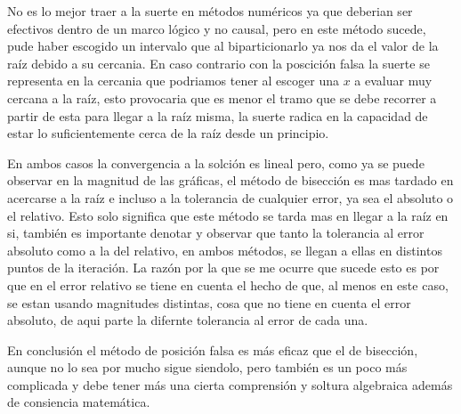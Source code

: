 \documentclass{article}
\begin{document}
No es lo mejor traer a la suerte en métodos numéricos ya que deberian ser efectivos dentro de un marco lógico y no causal, pero en este método sucede, pude haber escogido un intervalo que al biparticionarlo ya nos da el valor de la raíz debido a su cercania. En caso contrario con la poscición falsa la suerte se representa en la cercania que podriamos tener al escoger una $x$ a evaluar muy cercana a la raíz, esto provocaria que es menor el tramo que se debe recorrer a partir de esta para llegar a la raíz misma, la suerte radica en la capacidad de estar lo suficientemente cerca de la raíz desde un principio. 

En ambos casos la convergencia a la solción es lineal pero, como ya se puede observar en la magnitud de las gráficas, el método de bisección es mas tardado en acercarse a la raíz e incluso a la tolerancia de cualquier error, ya sea el absoluto o el relativo. Esto solo significa que este método se tarda mas en llegar a la raíz en si, también es importante denotar y observar que tanto la tolerancia al error absoluto como a la del relativo, en ambos métodos, se llegan a ellas en distintos puntos de la iteración. La razón por la que se me ocurre que sucede esto es por que en el error relativo se tiene en cuenta el hecho de que, al menos en este caso, se estan usando magnitudes distintas, cosa que no tiene en cuenta el error absoluto, de aqui parte la difernte tolerancia al error de cada una.

En conclusión el método de posición falsa es más eficaz que el de bisección, aunque no lo sea por mucho sigue siendolo, pero también es un poco más complicada y debe tener más una cierta comprensión y soltura algebraica además de consiencia matemática.
\end{document}
